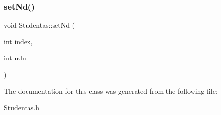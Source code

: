 \mbox{\label{class_studentas_a72f6b025786c2d5528521404bc76fc7d}} 
\subsubsection{\texorpdfstring{setNd()}{setNd()}}
{\footnotesize\ttfamily void Studentas\+::set\+Nd (\begin{DoxyParamCaption}\item[{int}]{index,  }\item[{int}]{ndn }\end{DoxyParamCaption})\hspace{0.3cm}{\ttfamily [inline]}}



The documentation for this class was generated from the following file\+:\begin{DoxyCompactItemize}
\item 
\mbox{\hyperlink{_studentas_8h}{Studentas.\+h}}\end{DoxyCompactItemize}
